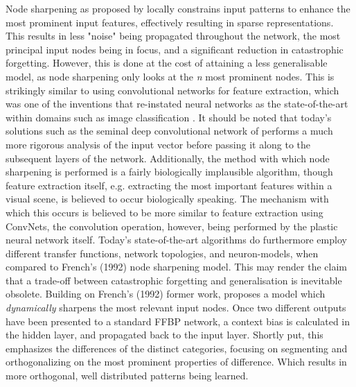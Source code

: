 Node sharpening as proposed by \cite{French1992} locally constrains input patterns to enhance the most prominent input features, effectively resulting in sparse representations. This results in less "noise" being propagated throughout the network, the most principal input nodes being in focus, and a significant reduction in catastrophic forgetting. However, this is done at the cost of attaining a less generalisable model, as node sharpening only looks at the \textit{n} most prominent nodes. This is strikingly similar to using convolutional networks for feature extraction, which was one of the inventions that re-instated neural networks as the state-of-the-art within domains such as image classification \citep{LeCun2015}. It should be noted that today's solutions such as the seminal deep convolutional network of \cite{Krizhevsky2012} performs a much more rigorous analysis of the input vector before passing it along to the subsequent layers of the network. Additionally, the method with which node sharpening is performed is a fairly biologically implausible algorithm, though feature extraction itself, e.g. extracting the most important features within a visual scene, is believed to occur biologically speaking. The mechanism with which this occurs is believed to be more similar to feature extraction using ConvNets, the convolution operation, however, being performed by the plastic neural network itself.
Today's state-of-the-art algorithms do furthermore employ different transfer functions, network topologies, and neuron-models, when compared to French's (1992) node sharpening model. This may render the claim that a trade-off between catastrophic forgetting and generalisation is inevitable obsolete.
Building on French's (1992) former work, \cite{French1994} proposes a model which \textit{dynamically} sharpens the most relevant input nodes. Once two different outputs have been presented to a standard FFBP network, a context bias is calculated in the hidden layer, and propagated back to the input layer. Shortly put, this emphasizes the differences of the distinct categories, focusing on segmenting and orthogonalizing on the most prominent properties of difference. Which results in more orthogonal, well distributed patterns being learned.
